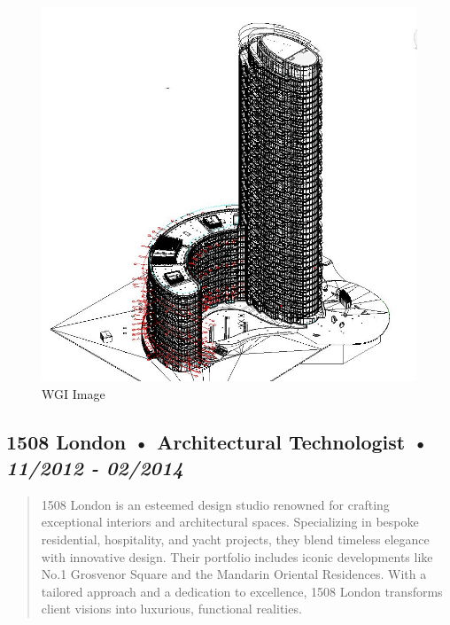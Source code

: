 \documentclass[
]{article}
\begin{document}
\begin{figure}[H]

{\centering \includegraphics{assets/WGI/WGI-OtherHohusing.JPG}

}

\caption{WGI Image}

\end{figure}%

\subsection{\texorpdfstring{1508 London • Architectural Technologist •
\emph{11/2012 -
02/2014}}{1508 London • Architectural Technologist • 11/2012 - 02/2014}}\label{london-architectural-technologist-112012---022014}

\begin{quote}
1508 London is an esteemed design studio renowned for crafting
exceptional interiors and architectural spaces. Specializing in bespoke
residential, hospitality, and yacht projects, they blend timeless
elegance with innovative design. Their portfolio includes iconic
developments like No.1 Grosvenor Square and the Mandarin Oriental
Residences. With a tailored approach and a dedication to excellence,
1508 London transforms client visions into luxurious, functional
realities.
\end{quote}
\end{document}
